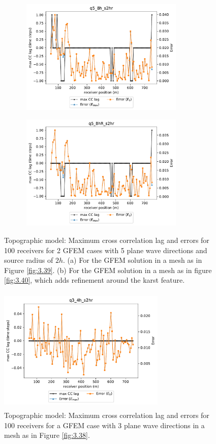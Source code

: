  \begin{figure}[h!]
 		\centering
		\begin{subfigure}{8cm}
				\includegraphics[width=8cm, height=5.5cm]{Thesis_Edith/figures/topo/topo_waves/Err_q5_8h_s2hr.pdf}
			     \caption{}
		\end{subfigure}
        \hspace{0.25cm}	
		\begin{subfigure}{8cm}
				\includegraphics[width=8cm, height=5.5cm]{Thesis_Edith/figures/topo/topo_waves/Err_q5_8hR_s2hr.pdf}
			   \caption{}
		\end{subfigure}
 
	\caption{Topographic model: Maximum cross correlation lag and errors for 100 receivers for 2 GFEM cases with 5 plane wave directions and source radius of $2h$. (a) For the GFEM solution in a mesh as in Figure \ref{fig:3.39}. (b) For the GFEM solution in a mesh as in figure \ref{fig:3.40}, which adds refinement around the karst feature.}
	\label{fig:3.47}
\end{figure}

 \begin{figure}[h!]
	\centering
	\includegraphics[width=8cm, height=6cm]{Thesis_Edith/figures/topo/topo_waves/Err_q3_4h_s2hr.pdf}
	\caption{Topographic model: Maximum cross correlation lag and errors for 100 receivers for a GFEM case with 3 plane wave directions in a mesh as in Figure \ref{fig:3.38}.}
	\label{fig:3.48}
\end{figure}

